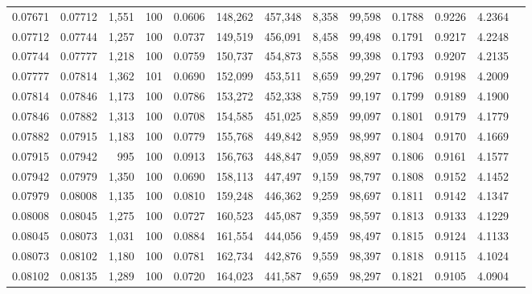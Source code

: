 \begin{tabular}{rrrrrrrrrrrrr}
0.07671 & 0.07712 & 1,551 & 100 &                                     0.0606 & 148,262 & 457,348 &   8,358 &  99,598 & 0.1788 & 0.9226 & 4.2364 \\
0.07712 & 0.07744 & 1,257 & 100 &                                     0.0737 & 149,519 & 456,091 &   8,458 &  99,498 & 0.1791 & 0.9217 & 4.2248 \\
0.07744 & 0.07777 & 1,218 & 100 &                                     0.0759 & 150,737 & 454,873 &   8,558 &  99,398 & 0.1793 & 0.9207 & 4.2135 \\
0.07777 & 0.07814 & 1,362 & 101 &                                     0.0690 & 152,099 & 453,511 &   8,659 &  99,297 & 0.1796 & 0.9198 & 4.2009 \\
0.07814 & 0.07846 & 1,173 & 100 &                                     0.0786 & 153,272 & 452,338 &   8,759 &  99,197 & 0.1799 & 0.9189 & 4.1900 \\
0.07846 & 0.07882 & 1,313 & 100 &                                     0.0708 & 154,585 & 451,025 &   8,859 &  99,097 & 0.1801 & 0.9179 & 4.1779 \\
0.07882 & 0.07915 & 1,183 & 100 &                                     0.0779 & 155,768 & 449,842 &   8,959 &  98,997 & 0.1804 & 0.9170 & 4.1669 \\
0.07915 & 0.07942 &   995 & 100 &                                     0.0913 & 156,763 & 448,847 &   9,059 &  98,897 & 0.1806 & 0.9161 & 4.1577 \\
0.07942 & 0.07979 & 1,350 & 100 &                                     0.0690 & 158,113 & 447,497 &   9,159 &  98,797 & 0.1808 & 0.9152 & 4.1452 \\
0.07979 & 0.08008 & 1,135 & 100 &                                     0.0810 & 159,248 & 446,362 &   9,259 &  98,697 & 0.1811 & 0.9142 & 4.1347 \\
0.08008 & 0.08045 & 1,275 & 100 &                                     0.0727 & 160,523 & 445,087 &   9,359 &  98,597 & 0.1813 & 0.9133 & 4.1229 \\
0.08045 & 0.08073 & 1,031 & 100 &                                     0.0884 & 161,554 & 444,056 &   9,459 &  98,497 & 0.1815 & 0.9124 & 4.1133 \\
0.08073 & 0.08102 & 1,180 & 100 &                                     0.0781 & 162,734 & 442,876 &   9,559 &  98,397 & 0.1818 & 0.9115 & 4.1024 \\
0.08102 & 0.08135 & 1,289 & 100 &                                     0.0720 & 164,023 & 441,587 &   9,659 &  98,297 & 0.1821 & 0.9105 & 4.0904 \\

\end{tabular}
